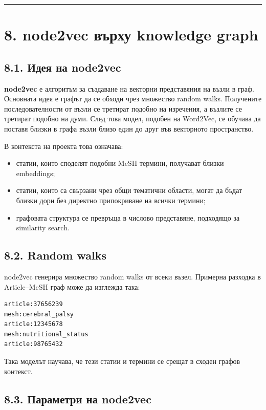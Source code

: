 \documentclass[12pt,a4paper]{article}
\providecommand{\tightlist}{\setlength{\itemsep}{0pt}\setlength{\parskip}{0pt}}
\begin{document}
\vspace{0.5em}\hrule\vspace{1.0em}

\section{8. node2vec върху knowledge graph}

\subsection{8.1. Идея на node2vec}

\textbf{node2vec} е алгоритъм за създаване на векторни представяния на възли в граф. Основната идея е графът да се обходи чрез множество random walks. Получените последователности от възли се третират подобно на изречения, а възлите се третират подобно на думи. След това модел, подобен на Word2Vec, се обучава да поставя близки в графа възли близо един до друг във векторното пространство.

В контекста на проекта това означава:

\begin{itemize}
\tightlist
\item
  статии, които споделят подобни MeSH термини, получават близки embeddings;
\item
  статии, които са свързани чрез общи тематични области, могат да бъдат близки дори без директно припокриване на всички термини;
\item
  графовата структура се превръща в числово представяне, подходящо за similarity search.
\end{itemize}

\subsection{8.2. Random walks}

node2vec генерира множество random walks от всеки възел. Примерна разходка в Article--MeSH граф може да изглежда така:

\begin{verbatim}
article:37656239
mesh:cerebral_palsy
article:12345678
mesh:nutritional_status
article:98765432
\end{verbatim}

Така моделът научава, че тези статии и термини се срещат в сходен графов контекст.

\subsection{8.3. Параметри на node2vec}
\end{document}
